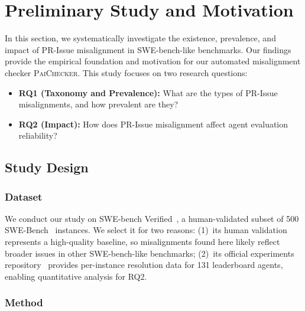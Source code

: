 \documentclass[sigconf, review, anonymous]{acmart}
\newcommand{\tool}{\textsc{PaiChecker}\xspace}
\begin{document}
    \section{Preliminary Study and Motivation}
    \label{sec:preliminary} In this section, we systematically investigate the
    existence, prevalence, and impact of PR-Issue misalignment in SWE-bench-like
    benchmarks. Our findings provide the empirical foundation and motivation for
    our automated misalignment checker \tool. This study focuses on two research
    questions:
    \begin{itemize}[leftmargin=*]
        \item \textbf{RQ1 (Taxonomy and Prevalence):} What are the types of PR-Issue
            misalignments, and how prevalent are they?

        \item \textbf{RQ2 (Impact):} How does PR-Issue misalignment affect agent
            evaluation reliability?
    \end{itemize}

    \subsection{Study Design}
    \label{sec:study_design}

    \subsubsection{Dataset}
    \label{sec:study_dataset} We conduct our study on SWE-bench Verified~\cite{swebenchverified},
  a human-validated subset of 500 SWE-Bench~\cite{swebench} instances.                     
  We select it for two reasons: (1)~its human validation represents a                      
  high-quality baseline, so misalignments found here likely reflect                        
  broader issues in other SWE-bench-like benchmarks; (2)~its official                      
  experiments repository~\cite{sweexperiments} provides per-instance                       
  resolution data for 131 leaderboard agents, enabling quantitative                        
  analysis for RQ2.

    \subsubsection{Method}
    \label{sec:study_method}
\end{document}
